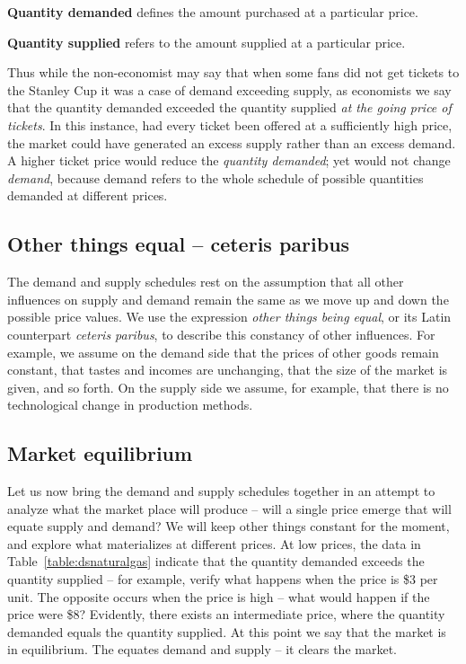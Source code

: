 \begin{DefBox}
\textbf{Quantity demanded} defines the amount purchased at a particular price.

\textbf{Quantity supplied} refers to the amount supplied at a particular price.
\end{DefBox}

Thus while the non-economist may say that when some fans did not get tickets to the Stanley Cup it was a case of demand exceeding supply, as economists we say that the quantity  demanded exceeded the quantity supplied \textit{at the going price of tickets}. In this instance, had every ticket been offered at a sufficiently high price, the market could have generated an excess supply rather than an excess demand. A higher ticket price would reduce the \textit{quantity demanded}; yet would not change \textit{demand}, because demand refers to the whole schedule of possible quantities demanded at different prices.

\subsection*{Other things equal -- ceteris paribus}

The demand and supply schedules rest on the assumption that all other influences on supply and demand remain the same as we move up and down the possible price values. We use the expression \textit{other things being equal}, or its Latin counterpart \textit{ceteris paribus}, to describe this constancy of other influences. For example, we assume on the demand side that the prices of other goods remain constant, that tastes and incomes are unchanging, that the size of the market is given, and so forth. On the supply side we assume, for example, that there is no technological change in production methods.

\subsection*{Market equilibrium}

Let us now bring the demand and supply schedules together in an attempt to analyze what the market place will produce -- will a single price emerge that will equate supply and demand? We will keep other things constant for the moment, and explore what materializes at different prices. At low prices, the data in Table~\ref{table:dsnaturalgas} indicate that the quantity demanded exceeds the quantity supplied -- for example, verify what happens when the price is \$3 per unit. The opposite occurs when the price is high -- what would happen if the price were \$8? Evidently, there exists an intermediate price, where the quantity demanded equals the quantity supplied. At this point we say that the market is in equilibrium. The  equates demand and supply -- it clears the market.

